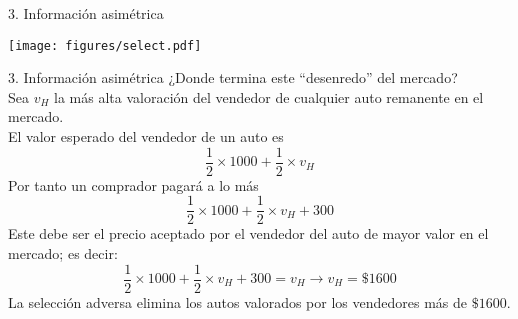 \begin{frame}{3. Información asimétrica}
	\begin{center}
		\texttt{[image: figures/select.pdf]}
	\end{center}
\end{frame}
\begin{frame}{3. Información asimétrica}
	¿Donde termina este ``desenredo'' del mercado?\\[0.3cm]
	Sea $v_H$ la más alta valoración del vendedor de cualquier auto remanente en el mercado.\\[0.3cm]
	El valor esperado del vendedor de un auto es
		$$\frac{1}{2}\times 1000 + \frac{1}{2}\times v_H$$
	Por tanto un comprador pagará a lo más
		$$\frac{1}{2}\times 1000 + \frac{1}{2}\times v_H + 300$$
	Este debe ser el precio aceptado por el vendedor del auto de mayor valor en el mercado; es decir:
		$$\frac{1}{2}\times 1000 + \frac{1}{2}\times v_H + 300 = v_H \longrightarrow v_H = \$1600$$
	La selección adversa elimina los autos valorados por los vendedores más de $\$1600$.
\end{frame}